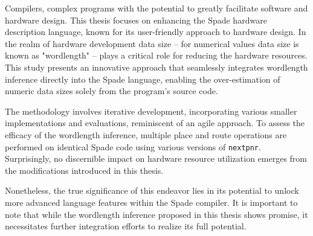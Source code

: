 Compilers, complex programs with the potential to greatly facilitate software and hardware design. This thesis focuses on enhancing the Spade hardware description language, known for its user-friendly approach to hardware design. In the realm of hardware development data size -- for numerical values data size is known as "wordlength" -- plays a critical role for reducing the hardware resources. This study presents an innovative approach that seamlessly integrates wordlength inference directly into the Spade language, enabling the over-estimation of numeric data sizes solely from the program's source code.

The methodology involves iterative development, incorporating various smaller implementations and evaluations, reminiscent of an agile approach. To assess the efficacy of the wordlength inference, multiple place and route operations are performed on identical Spade code using various versions of \verb+nextpnr+. Surprisingly, no discernible impact on hardware resource utilization emerges from the modifications introduced in this thesis.

Nonetheless, the true significance of this endeavor lies in its potential to unlock more advanced language features within the Spade compiler. It is important to note that while the wordlength inference proposed in this thesis shows promise, it necessitates further integration efforts to realize its full potential.
